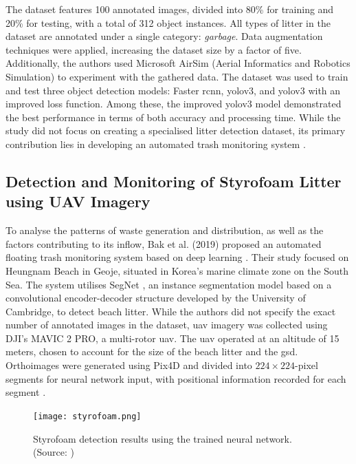 The dataset features 100 annotated images, divided into 80\% for training and 20\% for testing, with a total of 312 object instances. All types of litter in the dataset are annotated under a single category: \textit{garbage}. Data augmentation techniques were applied, increasing the dataset size by a factor of five. Additionally, the authors used Microsoft AirSim (Aerial Informatics and Robotics Simulation) to experiment with the gathered data. The dataset was used to train and test three object detection models: Faster \gls{rcnn}, \gls{yolo}v3, and \gls{yolo}v3 with an improved loss function. Among these, the improved \gls{yolo}v3 model demonstrated the best performance in terms of both accuracy and processing time. While the study did not focus on creating a specialised litter detection dataset, its primary contribution lies in developing an automated trash monitoring system \cite{superdock}.

\subsection{Detection and Monitoring of Styrofoam Litter using UAV Imagery}%
\label{subsec:3_styrofoam}
To analyse the patterns of waste generation and distribution, as well as the factors contributing to its inflow, Bak et al. (2019) proposed an automated floating trash monitoring system based on deep learning \cite{styrofoam}. Their study focused on Heungnam Beach in Geoje, situated in Korea’s marine climate zone on the South Sea. The system utilises SegNet \cite{segnet}, an instance segmentation model based on a convolutional encoder-decoder structure developed by the University of Cambridge, to detect beach litter.
While the authors did not specify the exact number of annotated images in the dataset, \gls{uav} imagery was collected using DJI's MAVIC 2 PRO, a multi-rotor \gls{uav}. The \gls{uav} operated at an altitude of 15 meters, chosen to account for the size of the beach litter and the \gls{gsd}. Orthoimages were generated using Pix4D and divided into $224 \times 224$-pixel segments for neural network input, with positional information recorded for each segment \cite{styrofoam}.

\begin{figure}[!htbp]
    \centering
    \texttt{[image: styrofoam.png]}
    \caption{Styrofoam detection results using the trained neural network. (Source: \cite{styrofoam})}
    \label{fig:styrofoam}
\end{figure}

